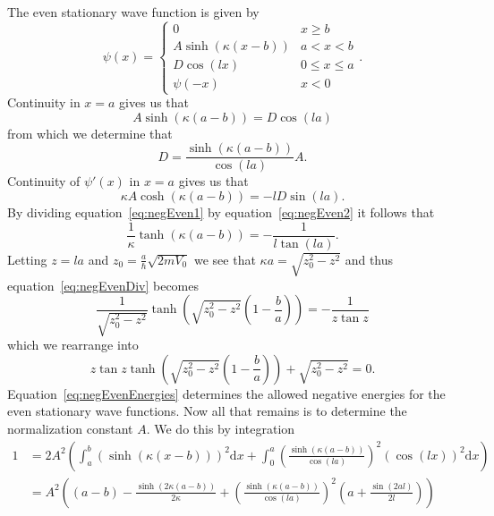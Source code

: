 \documentclass[12pt,a4paper]{article}
\begin{document}
The even stationary wave function is given by
\begin{equation}
\psi(x) = \begin{cases} 0 & x \geq b \\
                        A \sinh \left(\kappa (x - b) \right) & a < x < b \\
                        D \cos (l x) & 0 \leq x \leq a \\
                        \psi(-x) & x < 0
\end{cases}.
\end{equation}
Continuity in $x = a$ gives us that
\begin{equation}
A \sinh \left( \kappa (a - b) \right) = D \cos (l a) \label{eq:negEven1}
\end{equation}
from which we determine that
\begin{equation}
D = \frac{\sinh \left( \kappa (a - b) \right)}{\cos (l a)} A.
\end{equation}
Continuity of $\psi'(x)$ in $x = a$ gives us that
\begin{equation}
\kappa A \cosh \left( \kappa (a - b) \right) = - l D \sin (l a). \label{eq:negEven2}
\end{equation}
By dividing equation~\eqref{eq:negEven1} by equation~\eqref{eq:negEven2} it follows that
\begin{equation}
\frac{1}{\kappa} \tanh \left( \kappa (a - b) \right) = - \frac{1}{l \tan (l a)}. \label{eq:negEvenDiv}
\end{equation}
Letting $z = l a$ and $z_0 = \frac{a}{\hbar} \sqrt{2 m V_0}$ we see that $\kappa a = \sqrt{z_0^2 - z^2}$ and thus equation~\eqref{eq:negEvenDiv} becomes
\begin{equation}
\frac{1}{\sqrt{z_0^2 - z^2}} \tanh \left( \sqrt{z_0^2 - z^2} \left(1 - \frac{b}{a} \right) \right) = - \frac{1}{z \tan z}
\end{equation}
which we rearrange into
\begin{equation}
z \tan z \tanh \left( \sqrt{z_0^2 - z^2} \left( 1 - \frac{b}{a} \right) \right) + \sqrt{z_0^2 - z^2} = 0. \label{eq:negEvenEnergies}
\end{equation}
Equation~\eqref{eq:negEvenEnergies} determines the allowed negative energies for the even stationary wave functions. Now all that remains is to determine the normalization constant $A$. We do this by integration
\begin{align}
1 &= 2 A^2 \left( \int_a^b \left(\sinh \left( \kappa (x - b) \right) \right)^2 \mathrm{d}x + \int_0^a \left( \frac{\sinh \left(\kappa (a - b) \right)}{\cos (l a)} \right)^2 \left( \cos (lx) \right)^2 \mathrm{d} x \right) \\
  &= A^2 \left( (a - b) - \frac{\sinh \left( 2 \kappa (a - b) \right)}{2 \kappa}  + \left( \frac{\sinh \left(\kappa (a - b) \right)}{\cos (la)} \right)^2 \left(a + \frac{\sin(2 a l)}{2 l} \right) \right)
\end{align}
\end{document}
